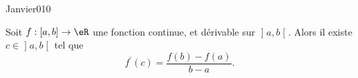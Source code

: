 \begin{corrige}{Janvier010}

Soit $f : [a,b] \to \eR$ une fonction continue, et dérivable sur $\mathopen]a,b\mathclose[$.  Alors il existe $c \in \mathopen]a,b\mathclose[$ tel que
\begin{equation}
  f^\prime(c) = \frac{f(b)-f(a)}{b-a}.
\end{equation}

%

\end{corrige}
